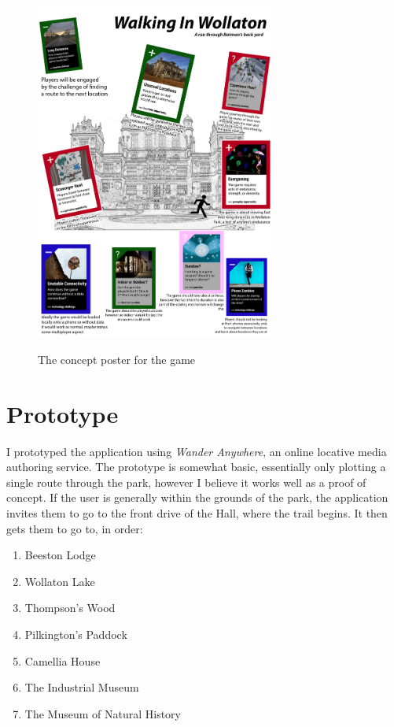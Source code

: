 \documentclass[12pt, a4paper]{article}
\begin{document}
\begin{figure}[ht]
\centering
  \caption{The concept poster for the game}
  \includegraphics[width=0.7\textwidth]{conceptposter.png}
  \label{fig:concept}
\end{figure}

\section{Prototype}

I prototyped the application using \textit{Wander Anywhere}, an online locative media authoring service.
The prototype is somewhat basic, essentially only plotting a single route through the park, however I believe it works well as a proof of concept.
If the user is generally within the grounds of the park, the application invites them to go to the front drive of the Hall, where the trail begins.
It then gets them to go to, in order:
\begin{enumerate}
  \item Beeston Lodge
  \item Wollaton Lake
  \item Thompson's Wood
  \item Pilkington's Paddock
  \item Camellia House
  \item The Industrial Museum
  \item The Museum of Natural History
\end{enumerate}
\end{document}
